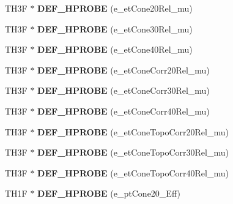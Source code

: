 \begin{DoxyCompactItemize}
\item 
\hypertarget{classHistos__Fake_a09c99fb2c25843963875220eb6919944}{
TH3F $\ast$ {\bfseries DEF\_\-HPROBE} (e\_\-etCone20Rel\_\-mu)}
\label{classHistos__Fake_a09c99fb2c25843963875220eb6919944}

\item 
\hypertarget{classHistos__Fake_a7c8463bb18fd143a1b5b8e038f1270b2}{
TH3F $\ast$ {\bfseries DEF\_\-HPROBE} (e\_\-etCone30Rel\_\-mu)}
\label{classHistos__Fake_a7c8463bb18fd143a1b5b8e038f1270b2}

\item 
\hypertarget{classHistos__Fake_a0965f70906c811075f5b925ca1997b6e}{
TH3F $\ast$ {\bfseries DEF\_\-HPROBE} (e\_\-etCone40Rel\_\-mu)}
\label{classHistos__Fake_a0965f70906c811075f5b925ca1997b6e}

\item 
\hypertarget{classHistos__Fake_ab99a076af0875ebc8bffe37e39f2a6e9}{
TH3F $\ast$ {\bfseries DEF\_\-HPROBE} (e\_\-etConeCorr20Rel\_\-mu)}
\label{classHistos__Fake_ab99a076af0875ebc8bffe37e39f2a6e9}

\item 
\hypertarget{classHistos__Fake_aa74c103958d346c5e43afa8d2e4223a6}{
TH3F $\ast$ {\bfseries DEF\_\-HPROBE} (e\_\-etConeCorr30Rel\_\-mu)}
\label{classHistos__Fake_aa74c103958d346c5e43afa8d2e4223a6}

\item 
\hypertarget{classHistos__Fake_a4f245f838ddcb15679324a5a3c64ef9b}{
TH3F $\ast$ {\bfseries DEF\_\-HPROBE} (e\_\-etConeCorr40Rel\_\-mu)}
\label{classHistos__Fake_a4f245f838ddcb15679324a5a3c64ef9b}

\item 
\hypertarget{classHistos__Fake_a7f406fe2e001a448615df1279f00393c}{
TH3F $\ast$ {\bfseries DEF\_\-HPROBE} (e\_\-etConeTopoCorr20Rel\_\-mu)}
\label{classHistos__Fake_a7f406fe2e001a448615df1279f00393c}

\item 
\hypertarget{classHistos__Fake_a9c95da85b5fec2714a17474502e319bf}{
TH3F $\ast$ {\bfseries DEF\_\-HPROBE} (e\_\-etConeTopoCorr30Rel\_\-mu)}
\label{classHistos__Fake_a9c95da85b5fec2714a17474502e319bf}

\item 
\hypertarget{classHistos__Fake_abb07ab111a7483fb02c523ae561657c0}{
TH3F $\ast$ {\bfseries DEF\_\-HPROBE} (e\_\-etConeTopoCorr40Rel\_\-mu)}
\label{classHistos__Fake_abb07ab111a7483fb02c523ae561657c0}

\item 
\hypertarget{classHistos__Fake_aa4fede65a3dcff56b46c5d8a2fa4c362}{
TH1F $\ast$ {\bfseries DEF\_\-HPROBE} (e\_\-ptCone20\_\-Eff)}
\label{classHistos__Fake_aa4fede65a3dcff56b46c5d8a2fa4c362}


\end{DoxyCompactItemize}
